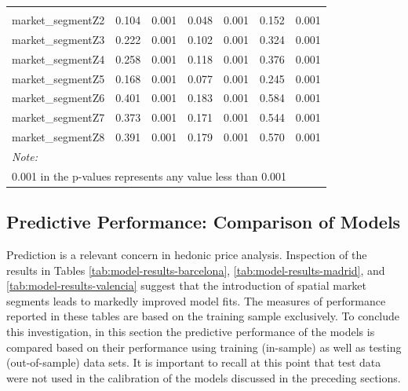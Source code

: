 \documentclass[Royal,times,sageh]{sagej}
\begin{document}
\begin{table}
{\begin{tabular}[t]{lcccccc}
\addlinespace[0.3em]
\multicolumn{7}{l}{\textbf{Market segments}}\\
\hspace{1em}market\_segmentZ2 & 0.104 & 0.001 & 0.048 & 0.001 & 0.152 & 0.001\\
\hspace{1em}market\_segmentZ3 & 0.222 & 0.001 & 0.102 & 0.001 & 0.324 & 0.001\\
\hspace{1em}market\_segmentZ4 & 0.258 & 0.001 & 0.118 & 0.001 & 0.376 & 0.001\\
\hspace{1em}market\_segmentZ5 & 0.168 & 0.001 & 0.077 & 0.001 & 0.245 & 0.001\\
\hspace{1em}market\_segmentZ6 & 0.401 & 0.001 & 0.183 & 0.001 & 0.584 & 0.001\\
\hspace{1em}market\_segmentZ7 & 0.373 & 0.001 & 0.171 & 0.001 & 0.544 & 0.001\\
\hspace{1em}market\_segmentZ8 & 0.391 & 0.001 & 0.179 & 0.001 & 0.570 & 0.001\\
\bottomrule
\multicolumn{7}{l}{\rule{0pt}{1em}\textit{Note: }}\\
\multicolumn{7}{l}{\rule{0pt}{1em}0.001 in the p-values represents any value less than 0.001}\\
\end{tabular}}
\end{table}

\hypertarget{predictive-performance-comparison-of-models}{%
\subsection{Predictive Performance: Comparison of
Models}\label{predictive-performance-comparison-of-models}}

Prediction is a relevant concern in hedonic price analysis. Inspection
of the results in Tables \ref{tab:model-results-barcelona},
\ref{tab:model-results-madrid}, and \ref{tab:model-results-valencia}
suggest that the introduction of spatial market segments leads to
markedly improved model fits. The measures of performance reported in
these tables are based on the training sample exclusively. To conclude
this investigation, in this section the predictive performance of the
models is compared based on their performance using training (in-sample)
as well as testing (out-of-sample) data sets. It is important to recall
at this point that test data were not used in the calibration of the
models discussed in the preceding sections.
\end{document}
